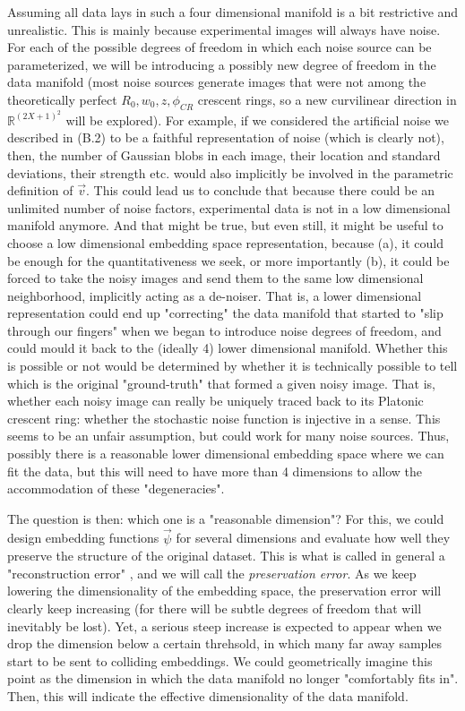 \documentclass[11pt, a4paper, twoside]{article} %
\newcommand{\R}{\mathbb{R}} %
\begin{document}
Assuming all data lays in such a four dimensional manifold is a bit restrictive and unrealistic. This is mainly because experimental images will always have noise. For each of the possible degrees of freedom in which each noise source can be parameterized, we will be introducing a possibly new degree of freedom in the data manifold (most noise sources generate images that were not among the theoretically perfect $R_0,w_0,z,\phi_{CR}$ crescent rings, so a new curvilinear direction in $\R^{(2X+1)^2}$ will be explored). For example, if we considered the artificial noise we described in (B.2) to be a faithful representation of noise (which is clearly not), then, the number of Gaussian blobs in each image, their location and standard deviations, their strength etc. would also implicitly be involved in the parametric definition of $\vec{v}$. This could lead us to conclude that because there could be an unlimited number of noise factors, experimental data is not in a low dimensional manifold anymore. And that might be true, but even still, it might be useful to choose a low dimensional embedding space representation, because (a), it could be enough for the quantitativeness we seek, or more importantly (b), it could be forced to take the noisy images and send them to the same low dimensional neighborhood, implicitly acting as a de-noiser. That is, a lower dimensional representation could end up "correcting" the data manifold that started to "slip through our fingers" when we began to introduce noise degrees of freedom, and could mould it back to the (ideally 4) lower dimensional manifold. Whether this is possible or not would be determined by whether it is technically possible to tell which is the original "ground-truth" that formed a given noisy image. That is, whether each noisy image can really be uniquely traced back to its Platonic crescent ring: whether the stochastic noise function is injective in a sense. This seems to be an unfair assumption, but could work for many noise sources. Thus, possibly there is a reasonable lower dimensional embedding space where we can fit the data, but this will need to have more than 4 dimensions to allow the accommodation of these "degeneracies".


The question is then: which one is a "reasonable dimension"? For this, we could design embedding functions $\vec{\psi}$ for several dimensions and evaluate how well they preserve the structure of the original dataset. This is what is called in general a "reconstruction error" \cite{manifold}, and we will call the {\em preservation error}. As we keep lowering the dimensionality of the embedding space, the preservation error will clearly keep increasing (for there will be subtle degrees of freedom that will inevitably be lost). Yet, a serious steep increase is expected to appear when we drop the dimension below a certain threhsold, in which many far away samples start to be sent to colliding embeddings. We could geometrically imagine this point as the dimension in which the data manifold no longer "comfortably fits in". Then, this will indicate the effective dimensionality of the data manifold.
\end{document}
